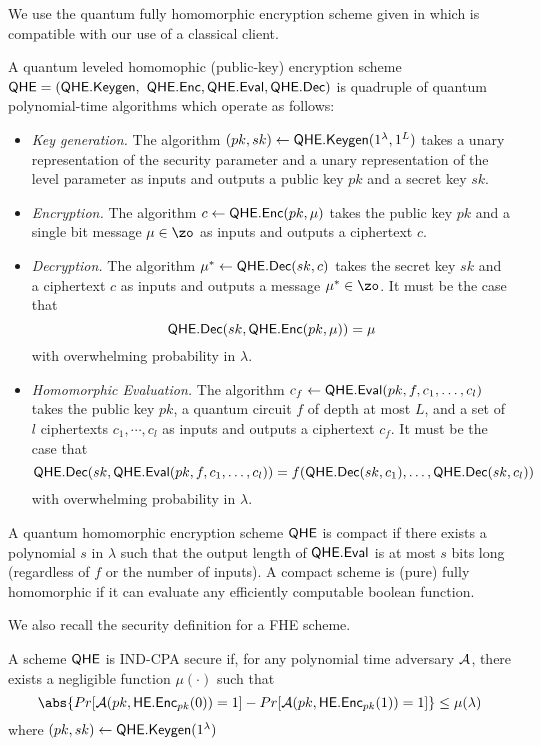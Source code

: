 We use the quantum fully homomorphic encryption scheme given in \cite{mahadev_qfhe} which is compatible with our use of a classical client.
\begin{definition}
	A quantum leveled homomophic (public-key) encryption scheme $\mathsf{QHE}=(\mathsf{QHE.Keygen},$ \linebreak
	$\mathsf{QHE.Enc}, \mathsf{QHE.Eval}, \mathsf{QHE.Dec})$ is quadruple of quantum polynomial-time algorithms which operate as follows:
	\begin{itemize}
		\item \emph{Key generation.}
			The algorithm $(pk, sk)\leftarrow\mathsf{QHE.Keygen}(1^\lambda, 1^L)$ takes a unary representation of the security parameter and a unary representation of the level parameter as inputs and outputs a public key $pk$ and a secret key $sk$.
		\item \emph{Encryption.}
			The algorithm $c\leftarrow\mathsf{QHE.Enc}(pk, \mu)$ takes the public key $pk$ and a single bit message $\mu\in\zo$ as inputs and outputs a ciphertext $c$.
		\item \emph{Decryption.}
			The algorithm $\mu^*\leftarrow\mathsf{QHE.Dec}(sk, c)$ takes the secret key $sk$ and a ciphertext $c$ as inputs and outputs a message $\mu^*\in\zo$.
			It must be the case that
				$$\mathsf{QHE.Dec}(sk, \mathsf{QHE.Enc}(pk, \mu))=\mu$$
			with overwhelming probability in $\lambda$.
		\item \emph{Homomorphic Evaluation.}
			The algorithm $c_f\leftarrow\mathsf{QHE.Eval}(pk, f, c_1, \ldots, c_l)$ takes the public key $pk$, a quantum circuit $f$ of depth at most $L$, and a set of $l$ ciphertexts $c_1,\cdots,c_l$ as inputs and outputs a ciphertext $c_f$.
			It must be the case that
				$$\mathsf{QHE.Dec}(sk, \mathsf{QHE.Eval}(pk, f, c_1, \ldots, c_l))=f(\mathsf{QHE.Dec}(sk, c_1),\ldots,\mathsf{QHE.Dec}(sk, c_l))$$
			with overwhelming probability in $\lambda$.
	\end{itemize}
\end{definition}

\begin{definition}
	A quantum homomorphic encryption scheme $\mathsf{QHE}$ is compact if
	there exists a polynomial $s$ in $\lambda$ such that the output length of $\mathsf{QHE.Eval}$ is at most $s$ bits long (regardless of $f$ or
	the number of inputs). A compact scheme is (pure) fully homomorphic if it can evaluate any efficiently computable
	boolean function.
\end{definition}

We also recall the security definition for a FHE scheme.

\begin{definition}
	A scheme $\mathsf{QHE}$ is IND-CPA secure if, for any polynomial time adversary $\mathcal{A}$, there exists a negligible function $\mu(\cdot)$ such that
	$$\abs{Pr[\cA(pk, \mathsf{HE.Enc}_{pk}(0))=1]-Pr[\cA(pk, \mathsf{HE.Enc}_{pk}(1))=1]}\leq\mu(\lambda)$$
	where $(pk, sk)\leftarrow\mathsf{QHE.Keygen}(1^\lambda)$
\end{definition}

